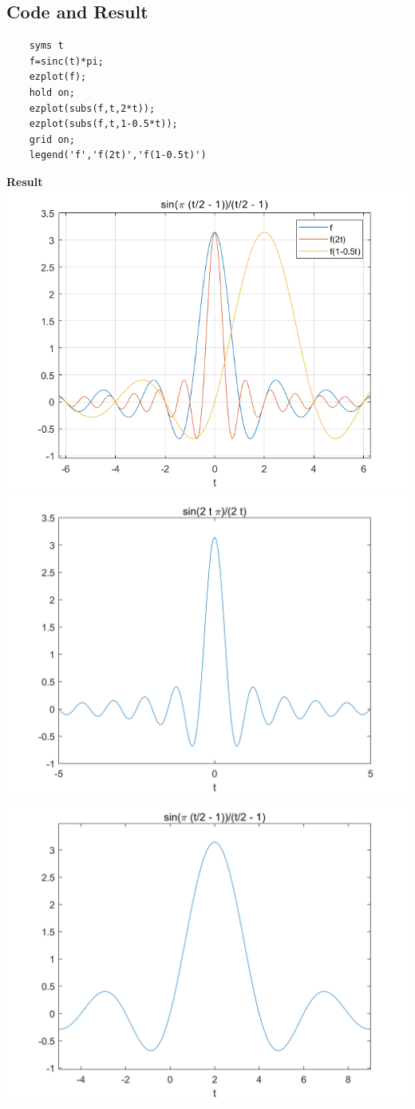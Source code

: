 \documentclass[UTF8,a4paper]{article}
\begin{document}
\subsection{Code and Result}
\begin{lstlisting}
    syms t
    f=sinc(t)*pi;
    ezplot(f);
    hold on;
    ezplot(subs(f,t,2*t));
    ezplot(subs(f,t,1-0.5*t));
    grid on;
    legend('f','f(2t)','f(1-0.5t)')
\end{lstlisting}
\textbf{Result}\\
\includegraphics[scale=0.6]{4.png}\\
\includegraphics[scale=0.6]{4-1.png}\\
\includegraphics[scale=0.6]{4-2.png}
\end{document}
